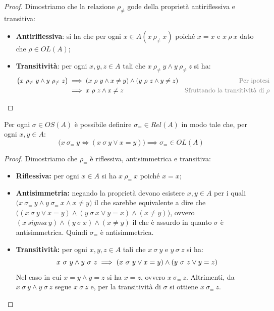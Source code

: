 \begin{proof}
	Dimostriamo che la relazione $\rho_{\neq}$ gode della proprietà antiriflessiva e transitiva:
	\begin{itemize}
		\item \textbf{Antiriflessiva}: si ha che per ogni $x \in A (x \ \rho_{\neq} \ x)$ poiché $x=x$ e $x \ \rho \ x $ dato che $\rho \in OL(A)$;
		\item \textbf{Transitività}: per ogni $x,y,z \in A$ tali che $x \ \rho_{\neq} \ y \land y \ \rho_{\neq} \ z$ si ha:
		\begin{align*}
			\bigl(x \ \rho_{\neq} \ y \land y \ \rho_{\neq} \ z\bigr) &\implies (x \ \rho \ y \land x \neq y) \land (y \ \rho \ z \land y \neq z) & \text{\textcolor{gray}{Per ipotesi}}\\
			&\implies x \ \rho \ z \land x \neq z & \text{\textcolor{gray}{Sfruttando la transitività di $\rho$}}
		\end{align*}
	\end{itemize}
\end{proof}

\begin{propbox}
	Per ogni $\sigma \in OS(A)$ è possibile definire $\sigma_{=} \in Rel(A)$ in modo tale che, per ogni $x,y \in A$:
	\begin{displaymath}
		\bigl( x \ \sigma_{=} \ y \iff (x \ \sigma \ y \lor x = y ) \bigr) \implies \sigma_{=} \in OL(A)
	\end{displaymath}
\end{propbox}

\begin{proof}
	Dimostriamo che $\rho_{=}$ è riflessiva, antisimmetrica e transitiva:
	\begin{itemize}
		\item \textbf{Riflessiva:} per ogni $x \in A$ si ha $x \ \rho_{=} \ x $ poiché $x=x$;
		\item \textbf{Antisimmetria:} negando la proprietà devono esistere $x,y \in A$ per i quali $\bigl(x \ \sigma_{=} \ y \land y \ \sigma_{=} \ x \land x \neq y \bigr)$ il che sarebbe equivalente a dire che $\bigl( (x \ \sigma \ y \lor x = y) \land (y \ \sigma \ x \lor y=x) \land (x \neq y) \bigr)$, ovvero $(x \ sigma \ y) \land (y \ \sigma \ x) \land (x \neq y)$ il che è assurdo in quanto $\sigma$ è antisimmetrica. Quindi $\sigma_{=}$ è antisimmetrica.
		\item \textbf{Transitività:} per ogni $x,y,z \in A$ tali che $x \ \sigma \ y $ e $y \ \sigma \ z$ si ha:
		\begin{displaymath}
			x \ \sigma \ y \land y \ \sigma \ z \implies (x \ \sigma \ y \lor x = y) \land (y \ \sigma \ z \lor y=z) \\
		\end{displaymath}
		Nel caso in cui $x=y \land y = z$ si ha $x=z$, ovvero $x \ \sigma_{=} \ z$. Altrimenti, da $x \ \sigma \ y \land y \ \sigma \ z$ segue $x \ \sigma \ z$ e, per la transitività di $\sigma$ si ottiene $x \ \sigma_{=} \ z$.
	\end{itemize}
\end{proof}

